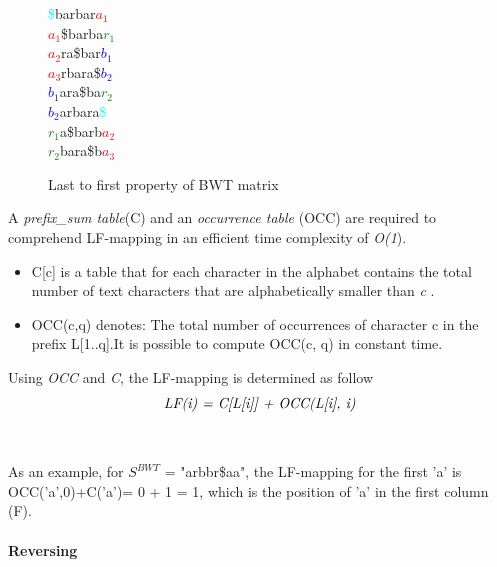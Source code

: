 \documentclass[11pt,a4paper]{report}
\begin{document}
\begin{figure}[H]
\centering
\textcolor{cyan}{\$}barbar\textcolor{red}{$a_1$}\\
\textcolor{red}{$a_1$}\$barba\textcolor{green}{$r_1$}\\
\textcolor{red}{$a_2$}ra\$bar\textcolor{blue}{$b_1$}\\
\textcolor{red}{$a_3$}rbara\$\textcolor{blue}{$b_2$}\\
\textcolor{blue}{$b_1$}ara\$ba\textcolor{green}{$r_2$}\\
\textcolor{blue}{$b_2$}arbara\textcolor{cyan}{\$}\\
\textcolor{green}{$r_1$}a\$barb\textcolor{red}{$a_2$}\\
\textcolor{green}{$r_2$}bara\$b\textcolor{red}{$a_3$}
 \caption{Last to first property of BWT matrix}
 \label{Lemma1}
\end{figure}

A \emph{prefix\_sum table}(C) and an \emph{occurrence table}
(OCC) are required to comprehend LF-mapping in an efficient time 
complexity of \emph{O(1}).\\

\begin{itemize}

	\item C[c] is a table that for each character in 
	the alphabet contains the total number of text 
	characters that are alphabetically smaller than
	 \emph{c} \cite{fmindex}.

	
	\item OCC(c,q) denotes:  The total number of 
	occurrences of character c in the prefix 
	L[1..q]\cite{fmindex}.It is possible to 
	compute OCC(c, q) in constant time.
	
\end{itemize}

Using \emph{OCC} and \emph{C}, the LF-mapping 
is determined as follow
$$\emph{LF(i) = C[L[i]] + OCC(L[i], i)}$$ \\\\

As an example, for $S^{BWT}$ = "arbbr\$aa", the LF-mapping
for the first 'a' is OCC('a',0)+C('a')= 0 + 1 = 1, which is 
the position of 'a' in the first column (F).




\paragraph{Reversing} \label{Reversing}
\end{document}
